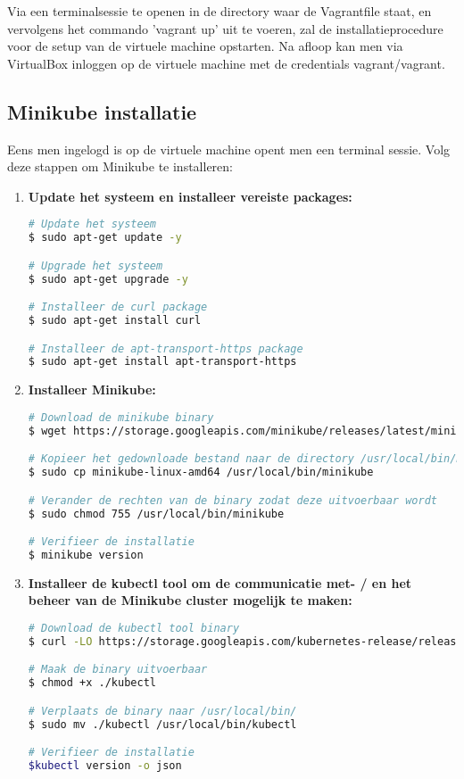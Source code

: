 Via een terminalsessie te openen in de directory waar de Vagrantfile staat, en vervolgens het commando 'vagrant up' uit te voeren, zal de installatieprocedure voor de setup van de virtuele machine opstarten. Na afloop kan men via VirtualBox inloggen op de virtuele machine met de credentials vagrant/vagrant. 


\subsection{Minikube installatie}

Eens men ingelogd is op de virtuele machine opent men een terminal sessie. 
Volg deze stappen om Minikube te installeren: \autocite{Simic2020}
\begin{enumerate}
    \item {\bf Update het systeem en installeer vereiste packages:}
\begin{lstlisting}[language=bash]
# Update het systeem
$ sudo apt-get update -y

# Upgrade het systeem
$ sudo apt-get upgrade -y

# Installeer de curl package
$ sudo apt-get install curl

# Installeer de apt-transport-https package
$ sudo apt-get install apt-transport-https
    \end{lstlisting}

    \item {\bf Installeer Minikube:}
\begin{lstlisting}[language=bash]
# Download de minikube binary
$ wget https://storage.googleapis.com/minikube/releases/latest/minikube-linux-amd64

# Kopieer het gedownloade bestand naar de directory /usr/local/bin/minikube
$ sudo cp minikube-linux-amd64 /usr/local/bin/minikube

# Verander de rechten van de binary zodat deze uitvoerbaar wordt
$ sudo chmod 755 /usr/local/bin/minikube

# Verifieer de installatie
$ minikube version
\end{lstlisting}

    \item {\bf Installeer de kubectl tool om de communicatie met- / en het beheer van de Minikube cluster mogelijk te maken:}
\begin{lstlisting}[language=bash]
# Download de kubectl tool binary
$ curl -LO https://storage.googleapis.com/kubernetes-release/release/`curl -s https://storage.googleapis.com/kubernetes-release/release/stable.txt`/bin/linux/amd64/kubectl

# Maak de binary uitvoerbaar
$ chmod +x ./kubectl

# Verplaats de binary naar /usr/local/bin/
$ sudo mv ./kubectl /usr/local/bin/kubectl

# Verifieer de installatie
$kubectl version -o json
\end{lstlisting}
    
\end{enumerate} 

